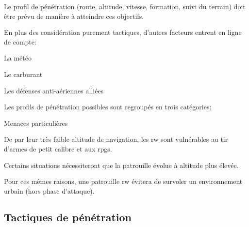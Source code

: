 \begin{e1}
	\item Le profil de pénétration (route, altitude, vitesse, formation, suivi du terrain) doit être prévu de manière à atteindre ces objectifs.
	\item En plus des considération purement tactiques, d'autres facteurs entrent en ligne de compte:
	\begin{e2}
		\item La météo
		\item Le carburant
		\item Les défenses anti-aériennes alliées
	\end{e2}
	\item Les profils de pénétration possibles sont regroupés en trois catégories:

	\item Menaces particulières

	\begin{e2}
		\item De par leur très faible altitude de navigation, les \gls{rw} sont vulnérables au tir d'armes de petit calibre et aux \glspl{rpg}.
		\item Certains situations nécessiteront que la patrouille évolue à altitude plus élevée.
		\item Pour ces mêmes raisons, une patrouille \gls{rw} évitera de survoler un environnement urbain (hors phase d'attaque).
	\end{e2}

\end{e1}

\subsection{Tactiques de pénétration}

